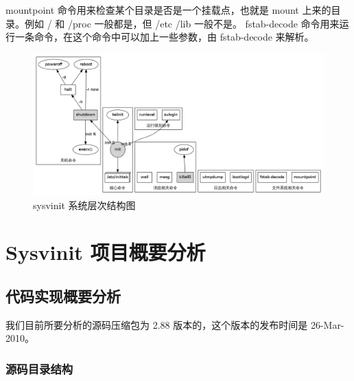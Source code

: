 mountpoint 命令用来检查某个目录是否是一个挂载点，也就是 mount
上来的目录。例如 / 和 /proc 一般都是，但 /etc /lib 一般不是。
fstab-decode 命令用来运行一条命令，在这个命令中可以加上一些参数，由
fstab-decode 来解析。

\begin{figure}[htbp]
\centering
\includegraphics{./figures/sys.png}
\caption{sysvinit 系统层次结构图}
\end{figure}

\chapter{Sysvinit 项目概要分析}

\section{代码实现概要分析}

我们目前所要分析的源码压缩包为 2.88 版本的，这个版本的发布时间是
26-Mar-2010。

\subsection{源码目录结构}

